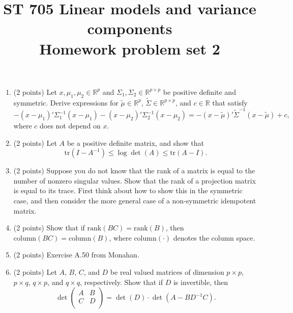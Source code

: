 \documentclass[11pt]{article}
\title{ST 705 Linear models and variance components \\ 
        Homework problem set 2}
\begin{document}
\maketitle

\begin{enumerate}

\item(2 points) Let $x, \mu_{1}, \mu_{2} \in \mathbb{R}^{p}$ and $\Sigma_{1}, \Sigma_{2} \in \mathbb{R}^{p\times p}$ be positive definite and symmetric.  Derive expressions for $\widetilde{\mu} \in \mathbb{R}^{p}$, $\widetilde{\Sigma} \in \mathbb{R}^{p\times p}$, and $c \in \mathbb{R}$ that satisfy
\[
-(x - \mu_{1})'\Sigma_{1}^{-1}(x - \mu_{1}) - (x - \mu_{2})'\Sigma_{2}^{-1}(x - \mu_{2}) = -(x - \widetilde{\mu})'\widetilde{\Sigma}^{-1}(x - \widetilde{\mu}) + c,
\]
where $c$ does not depend on $x$.

\item(2 points) Let $A$ be a positive definite matrix, and show that 
\[
\text{tr}(I - A^{-1}) \le \log\det(A) \le \text{tr}(A - I).
\]

\item(2 points) Suppose you do not know that the rank of a matrix is equal to the number of nonzero singular values.  Show that the rank of a projection matrix is equal to its trace.  First think about how to show this in the symmetric case, and then consider the more general case of a non-symmetric idempotent matrix.

\item(2 points) Show that if $\text{rank}(BC) = \text{rank}(B)$, then $\text{column}(BC) = \text{column}(B)$, where column$(\cdot)$ denotes the column space.

\item(2 points) Exercise A.50 from Monahan.

\item(2 points) Let $A$, $B$, $C$, and $D$ be real valued matrices of dimension $p\times p$, $p\times q$, $q\times p$, and $q\times q$, respectively.  Show that if $D$ is invertible, then
\[
\det
\begin{pmatrix}
A & B \\
C & D \\
\end{pmatrix} = \det(D) \cdot \det(A - BD^{-1}C).
\]


\end{enumerate}
\end{document}
